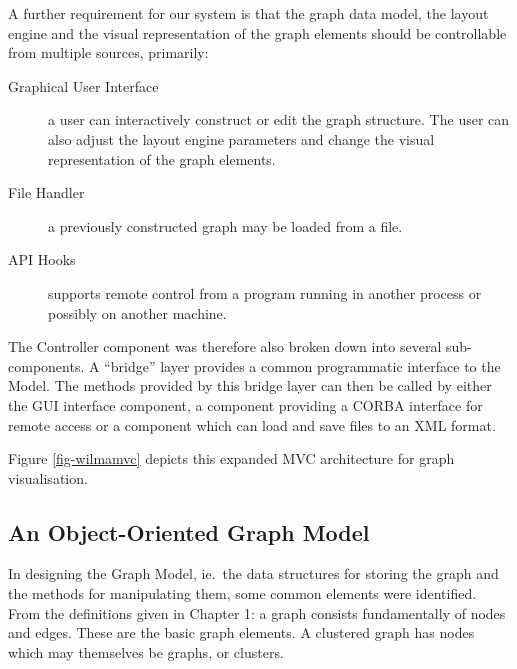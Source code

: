\documentclass[runningheads]{cl2emult}
\begin{document}
A further requirement for our system is that the graph data model,
the layout engine and the visual representation of the graph elements should be controllable from multiple sources, primarily:
\begin{description}
\item[Graphical User Interface] a user can interactively construct or
edit the graph structure.  The user can also adjust the layout engine parameters and change the visual representation of the graph elements.
\item[File Handler] a previously constructed graph may be loaded from a file.
\item[API Hooks] supports remote control from a program running in another process or possibly on
another machine. 
\end{description}
The Controller component was therefore also broken
down into several sub-components.  A ``bridge'' layer provides a common
programmatic interface to the Model.  The methods provided by this
bridge layer can then be called by either the GUI interface component,
a component providing a CORBA interface for remote access or a component which
can load and save files to an XML format.

Figure \ref{fig-wilmamvc} depicts this expanded MVC architecture for graph
visualisation. 

\subsection{An Object-Oriented Graph Model}
In designing the Graph Model, ie.\ the data structures for storing the
graph and the methods for manipulating them, some common
elements were identified.  From the definitions given in Chapter 
1: a graph consists fundamentally
of nodes and edges.  These are the basic graph elements.  A clustered
graph has nodes which may themselves be graphs, or clusters.
\end{document}
